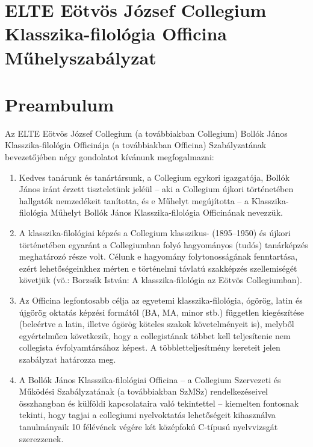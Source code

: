 \documentclass{../styles/rulebook}
\begin{document}
\section*{ELTE Eötvös József Collegium \\ Klasszika-filológia Officina\\ \vspace{0.5em} Műhelyszabályzat} 

\vspace{2em}

\section*{Preambulum}

Az ELTE Eötvös József Collegium (a továbbiakban Collegium) Bollók János Klasszika-filológia Officinája (a továbbiakban Officina) Szabályzatának bevezetőjében négy gondolatot kívánunk megfogalmazni:

\begin{enumerate}[label=\Roman*.]
\item Kedves tanárunk és tanártársunk, a Collegium egykori igazgatója, Bollók János iránt érzett tiszteletünk jeléül – aki a Collegium újkori történetében hallgatók nemzedékeit tanította, és e Műhelyt megújította – a Klasszika-filológia Műhelyt Bollók János Klasszika-filológia Officinának nevezzük.
\item A klasszika-filológiai képzés a Collegium klasszikus- (1895–1950) és újkori történetében egyaránt a Collegiumban folyó hagyományos (tudós) tanárképzés meghatározó része volt. Célunk e hagyomány folytonosságának fenntartása, ezért lehetőségeinkhez mérten e történelmi távlatú szakképzés szellemiségét követjük (vö.: Borzsák István: A klasszika-filológia az Eötvös Collegiumban).
\item Az Officina legfontosabb célja az egyetemi klasszika-filológia, ógörög, latin és újgörög oktatás képzési formától (BA, MA, minor stb.) független kiegészítése (beleértve a latin, illetve ógörög köteles szakok követelményeit is), melyből egyértelműen következik, hogy a collegistának többet kell teljesítenie nem collegista évfolyamtársához képest. A többletteljesítmény kereteit jelen szabályzat határozza meg.
\item A Bollók János Klasszika-filológiai Officina -- a Collegium Szervezeti és Működési Szabályzatának (a továbbiakban SzMSz) rendelkezéseivel összhangban és külföldi kapcsolataira való tekintettel -- kiemelten fontosnak tekinti, hogy tagjai a collegiumi nyelvoktatás lehetőségeit kihasználva tanulmányaik 10 félévének végére két középfokú C-típusú nyelvvizsgát szerezzenek.

\end{enumerate}
\end{document}
